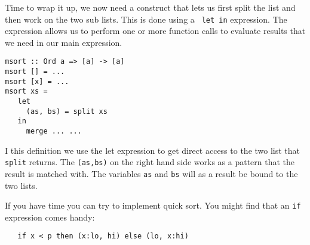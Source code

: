 \documentclass[a4paper,11pt]{article}
\begin{document}
Time to wrap it up, we now need a construct that lets us first split
the list and then work on the two sub lists. This is done using a {\tt
  let in} expression. The expression allows us to perform one or more
function calls to evaluate results that we need in our main expression. 

\begin{verbatim}
msort :: Ord a => [a] -> [a]
msort [] = ...
msort [x] = ...
msort xs = 
   let 
     (as, bs) = split xs
   in
     merge ... ...
\end{verbatim}

I this definition we use the let expression to get direct access to
the two list that {\tt split} returns. The {\tt (as,bs)} on the right
hand side works as a pattern that the result is matched with. The
variables {\tt as} and {\tt bs} will as a result be bound to the two
lists.

If you have time you can try to implement quick sort. You might find
that an {\tt if} expression comes handy:

\begin{verbatim}
   if x < p then (x:lo, hi) else (lo, x:hi)
\end{verbatim}
\end{document}
